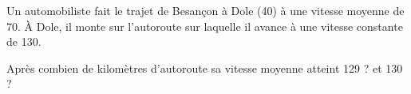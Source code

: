 
\begin{exercice}\label{exosmath-0377}

    Un automobiliste fait le trajet de Besançon à Dole (\unit{40}{\kilo\meter}) à une vitesse moyenne de \unit{70}{\kilo\meter\per\hour}. À Dole, il monte sur l'autoroute sur laquelle il avance à une vitesse constante de \unit{130}{\kilo\meter\per\hour}.

    Après combien de kilomètres d'autoroute sa vitesse moyenne atteint \unit{129}{\kilo\meter\per\hour} ? et \unit{130}{\kilo\meter\per\hour} ?

\end{exercice}

